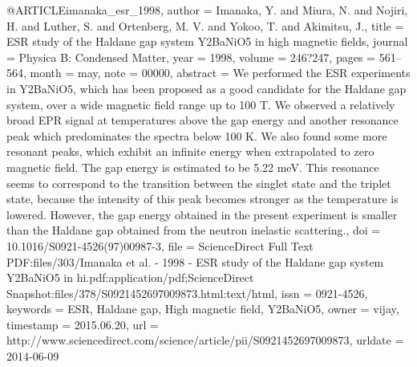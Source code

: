 @ARTICLE{imanaka_esr_1998,
  author = {Imanaka, Y. and Miura, N. and Nojiri, H. and Luther, S. and Ortenberg,
	M. V. and Yokoo, T. and Akimitsu, J.},
  title = {{ESR} study of the {Haldane} gap system {Y}2BaNiO5 in high magnetic
	fields},
  journal = {Physica B: Condensed Matter},
  year = {1998},
  volume = {246?247},
  pages = {561--564},
  month = may,
  note = {00000},
  abstract = {We performed the ESR experiments in Y2BaNiO5, which has been proposed
	as a good candidate for the Haldane gap system, over a wide magnetic
	field range up to 100 T. We observed a relatively broad EPR signal
	at temperatures above the gap energy and another resonance peak which
	predominates the spectra below 100 K. We also found some more resonant
	peaks, which exhibit an infinite energy when extrapolated to zero
	magnetic field. The gap energy is estimated to be 5.22 meV. This
	resonance seems to correspond to the transition between the singlet
	state and the triplet state, because the intensity of this peak becomes
	stronger as the temperature is lowered. However, the gap energy obtained
	in the present experiment is smaller than the Haldane gap obtained
	from the neutron inelastic scattering.},
  doi = {10.1016/S0921-4526(97)00987-3},
  file = {ScienceDirect Full Text PDF:files/303/Imanaka et al. - 1998 - ESR study of the Haldane gap system Y2BaNiO5 in hi.pdf:application/pdf;ScienceDirect Snapshot:files/378/S0921452697009873.html:text/html},
  issn = {0921-4526},
  keywords = {ESR, Haldane gap, High magnetic field, Y2BaNiO5},
  owner = {vijay},
  timestamp = {2015.06.20},
  url = {http://www.sciencedirect.com/science/article/pii/S0921452697009873},
  urldate = {2014-06-09}
}

